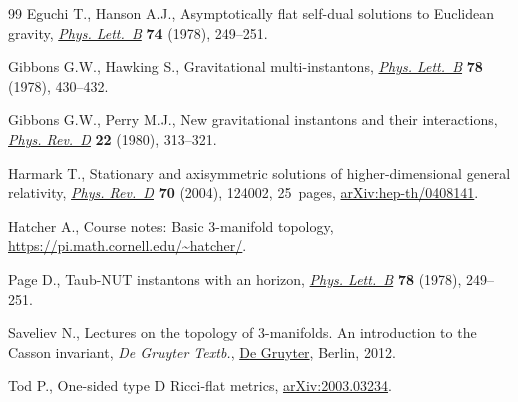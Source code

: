 \begin{thebibliography}{99}
Eguchi T., Hanson A.J., Asymptotically flat self-dual solutions to {E}uclidean
 gravity, \href{https://doi.org/10.1016/0370-2693(78)90566-X}{\textit{Phys. Lett.~B}} \textbf{74} (1978), 249--251.

Gibbons G.W., Hawking S., Gravitational multi-instantons, \href{https://doi.org/10.1016/0370-2693(78)90478-1}{\textit{Phys.
 Lett.~B}} \textbf{78} (1978), 430--432.

Gibbons G.W., Perry M.J., New gravitational instantons and their interactions,
 \href{https://doi.org/10.1103/PhysRevD.22.313}{\textit{Phys. Rev.~D}} \textbf{22} (1980), 313--321.

Harmark T., Stationary and axisymmetric solutions of higher-dimensional general
 relativity, \href{https://doi.org/10.1103/PhysRevD.70.124002}{\textit{Phys. Rev.~D}} \textbf{70} (2004), 124002, 25~pages,
 \href{https://arxiv.org/abs/hep-th/0408141}{arXiv:hep-th/0408141}.

Hatcher A., Course notes: {B}asic 3-manifold topology,
 \url{https://pi.math.cornell.edu/~hatcher/}.

Page D., Taub-{NUT} instantons with an horizon, \href{https://doi.org/10.1016/0370-2693(78)90016-3}{\textit{Phys. Lett.~B}}
 \textbf{78} (1978), 249--251.

Saveliev N., Lectures on the topology of 3-manifolds. {A}n introduction to the
 {C}asson invariant, \textit{{D}e Gruyter Textb.}, \href{https://doi.org/10.1515/9783110250367}{{D}e Gruyter}, Berlin, 2012.

Tod P., One-sided type {D} {R}icci-flat metrics, \href{https://arxiv.org/abs/2003.03234}{arXiv:2003.03234}.

\end{thebibliography}
